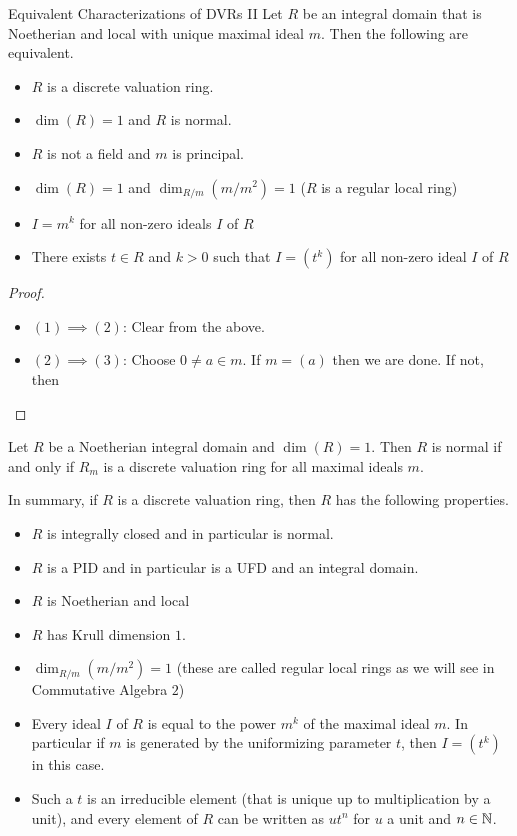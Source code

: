\documentclass[a4paper]{article}
\begin{document}
\begin{prp}{Equivalent Characterizations of DVRs II}{} Let $R$ be an integral domain that is Noetherian and local with unique maximal ideal $m$. Then the following are equivalent. 
\begin{itemize}
\item $R$ is a discrete valuation ring. 
\item $\dim(R)=1$ and $R$ is normal. 
\item $R$ is not a field and $m$ is principal. 
\item $\dim(R)=1$ and $\dim_{R/m}(m/m^2)=1$ ($R$ is a regular local ring)
\item $I=m^k$ for all non-zero ideals $I$ of $R$
\item There exists $t\in R$ and $k>0$ such that $I=(t^k)$ for all non-zero ideal $I$ of $R$
\end{itemize} \tcbline
\begin{proof}~\\
\begin{itemize}
\item $(1)\implies(2)$: Clear from the above. 
\item $(2)\implies(3)$: Choose $0\neq a\in m$. If $m=(a)$ then we are done. If not, then 
\end{itemize}
\end{proof}
\end{prp}

\begin{prp}{}{} Let $R$ be a Noetherian integral domain and $\dim(R)=1$. Then $R$ is normal if and only if $R_m$ is a discrete valuation ring for all maximal ideals $m$. 
\end{prp}

In summary, if $R$ is a discrete valuation ring, then $R$ has the following properties. 
\begin{itemize}
\item $R$ is integrally closed and in particular is normal. 
\item $R$ is a PID and in particular is a UFD and an integral domain. 
\item $R$ is Noetherian and local
\item $R$ has Krull dimension $1$. 
\item $\dim_{R/m}(m/m^2)=1$ (these are called regular local rings as we will see in Commutative Algebra $2$)
\item Every ideal $I$ of $R$ is equal to the power $m^k$ of the maximal ideal $m$. In particular if $m$ is generated by the uniformizing parameter $t$, then $I=(t^k)$ in this case. 
\item Such a $t$ is an irreducible element (that is unique up to multiplication by a unit), and every element of $R$ can be written as $ut^n$ for $u$ a unit and $n\in\mathbb{N}$. 
\end{itemize}
\end{document}
